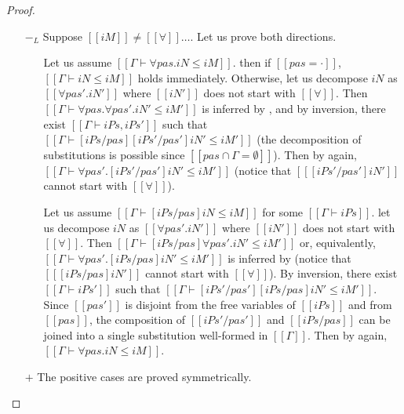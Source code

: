 \begin{proof}
\begin{itemize}
\begin{itemize}
      \end{itemize}
    \item [$-_{L}$] Suppose $[[iM]] \neq [[∀]]\dots$. Let us prove both directions.
      \begin{itemize}
        \item [\Rightarrow] Let us assume $[[Γ ⊢ ∀pas.iN ≤ iM]]$.
          then if $[[pas = ·]]$, $[[Γ ⊢ iN ≤ iM]]$ holds immediately.
          Otherwise, let us decompose  $iN$ as $[[∀pas'.iN']]$ where 
          $[[iN']]$ does not start with $[[∀]]$.
          Then $[[Γ ⊢ ∀pas.∀pas'.iN' ≤ iM']]$ is inferred by
          ,
          and by inversion, 
          there exist $[[Γ ⊢ iPs,iPs']]$ 
          such that $[[Γ ⊢ [iPs/pas][iPs'/pas']iN' ≤ iM']]$ 
          (the decomposition of substitutions is possible since $[[{pas} ∩ {Γ} = ∅]]$).
          Then by  again,
          $[[Γ ⊢ ∀pas'.[iPs'/pas']iN' ≤ iM']]$ (notice that $[[ [iPs'/pas']iN' ]]$ cannot
          start with $[[∀]]$).
        \item [\Leftarrow] Let us assume 
          $[[Γ ⊢ [iPs/pas]iN ≤ iM]]$ for some $[[Γ ⊢ iPs]]$.
          let us decompose $iN$ as $[[∀pas'.iN']]$ where $[[iN']]$ does not start with $[[∀]]$.
          Then $[[Γ ⊢ [iPs/pas]∀pas'.iN' ≤ iM']]$ or, equivalently,
          $[[Γ ⊢ ∀pas'.[iPs/pas]iN' ≤ iM']]$ is inferred by 
          (notice that $[[ [iPs/pas]iN' ]]$ cannot start with $[[∀]]$).
          By inversion, there exist $[[Γ ⊢ iPs']]$ such that 
          $[[Γ ⊢ [iPs'/pas'][iPs/pas]iN' ≤ iM']]$. Since $[[pas']]$ is disjoint
          from the free variables of $[[iPs]]$ and from $[[pas]]$, the composition of 
          $[[iPs'/pas']]$ and $[[iPs/pas]]$ can be joined into a single substitution
          well-formed in $[[Γ]]$. Then by  again,
          $[[Γ ⊢ ∀pas.iN ≤ iM]]$.
      \end{itemize}
      \item [$+$] The positive cases are proved symmetrically.
  \end{itemize}
\end{proof}

